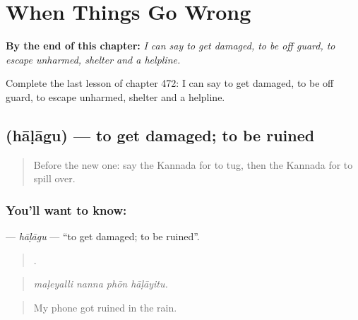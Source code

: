 
\chapter{When Things Go Wrong}
\label{ch:ka-when-things-go-wrong}

\begin{chapteropening}
\textbf{By the end of this chapter:} \emph{I can say to get damaged, to be off guard, to escape unharmed, shelter and a helpline.}

Complete the last lesson of chapter 472: I can say to get damaged, to be off guard, to escape unharmed, shelter and a helpline.
\end{chapteropening}

\section[\texorpdfstring{\kn{ಹಾಳಾಗು} (hāḷāgu)}{ಹಾಳಾಗು (hāḷāgu)}]{ (hāḷāgu) — to get damaged; to be ruined}

\label{lesson:KA-C472-halagu}



\begin{quote}
Before the new one: say the Kannada for to tug, then the Kannada for to spill over.
\end{quote}

\subsection*{You'll want to know: }
\textbf{} — \emph{hāḷāgu} — \textquotedblleft{}to get damaged; to be ruined\textquotedblright{}.

\begin{quote}
   .
\end{quote}

\begin{quote}
\emph{maḷeyalli nanna phōn hāḷāyitu.}
\end{quote}

\begin{quote}
My phone got ruined in the rain.
\end{quote}


